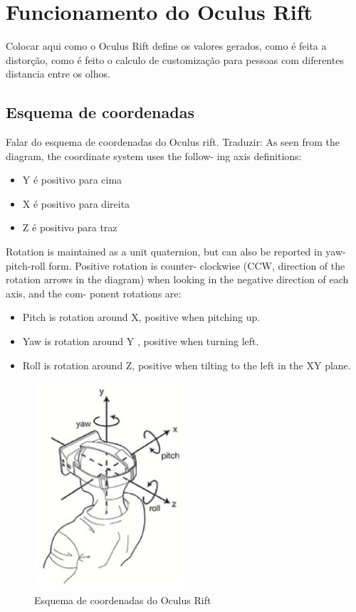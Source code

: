 \section{Funcionamento do Oculus Rift}
Colocar aqui como o Oculus Rift define os valores gerados, como é feita a distorção, como é feito o calculo de customização para pessoas com diferentes distancia entre os olhos.

\subsection{Esquema de coordenadas}
Falar do esquema de coordenadas do Oculus rift. Traduzir:
As seen from the diagram, the coordinate system uses the follow-
ing axis definitions:
\begin{itemize}
	\item Y é positivo para cima
	\item X é positivo para direita
	\item Z é positivo para traz
\end{itemize}
Rotation is maintained as a unit quaternion, but can also be
reported in yaw-pitch-roll form. Positive rotation is counter-
clockwise (CCW, direction of the rotation arrows in the diagram)
when looking in the negative direction of each axis, and the com-
ponent rotations are:
\begin{itemize}
	\item Pitch is rotation around X, positive when pitching up.
	\item Yaw is rotation around Y , positive when turning left.
	\item Roll is rotation around Z, positive when tilting to the left in the XY plane.
\end{itemize}

\begin{figure}[h]
  \centering
  \includegraphics[width=0.5\textwidth]
      {figuras/esquema_coordenadas_rift.eps}
  \caption{Esquema de coordenadas do Oculus Rift}
  \label{coordenadas-rift}
\end{figure}

